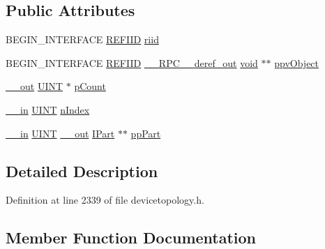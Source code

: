 \subsection*{Public Attributes}
\begin{DoxyCompactItemize}
\item 
B\+E\+G\+I\+N\+\_\+\+I\+N\+T\+E\+R\+F\+A\+CE \hyperlink{px__win__ds_8c_a80ec49c8ae61e234197d5071d2df497d}{R\+E\+F\+I\+ID} \hyperlink{struct_i_parts_list_vtbl_a64c041e5979c2a523f9fb3580a5993f9}{riid}
\item 
B\+E\+G\+I\+N\+\_\+\+I\+N\+T\+E\+R\+F\+A\+CE \hyperlink{px__win__ds_8c_a80ec49c8ae61e234197d5071d2df497d}{R\+E\+F\+I\+ID} \hyperlink{rpcsal_8h_a23bc188526f10656f9c79d950f6c3192}{\+\_\+\+\_\+\+R\+P\+C\+\_\+\+\_\+deref\+\_\+out} \hyperlink{sound_8c_ae35f5844602719cf66324f4de2a658b3}{void} $\ast$$\ast$ \hyperlink{struct_i_parts_list_vtbl_a9686d042884915b00bb6ce3bad267549}{ppv\+Object}
\item 
\hyperlink{sal_8h_abb4c3c1135aab6c47cff22e7c16efb74}{\+\_\+\+\_\+out} \hyperlink{mapinls_8h_a36cb3b01d81ffd844bbbfb54003e06ec}{U\+I\+NT} $\ast$ \hyperlink{struct_i_parts_list_vtbl_aa5fa48419eddb181e7b5a7c5127bfcf0}{p\+Count}
\item 
\hyperlink{sal_8h_a3f6b8655e1aa9dfc15a9029f0343009e}{\+\_\+\+\_\+in} \hyperlink{mapinls_8h_a36cb3b01d81ffd844bbbfb54003e06ec}{U\+I\+NT} \hyperlink{struct_i_parts_list_vtbl_abef078e3fb82b1be38e9620afee2532f}{n\+Index}
\item 
\hyperlink{sal_8h_a3f6b8655e1aa9dfc15a9029f0343009e}{\+\_\+\+\_\+in} \hyperlink{mapinls_8h_a36cb3b01d81ffd844bbbfb54003e06ec}{U\+I\+NT} \hyperlink{sal_8h_abb4c3c1135aab6c47cff22e7c16efb74}{\+\_\+\+\_\+out} \hyperlink{devicetopology_8h_adabb5bd8e19759521e1498eef1d0b56f}{I\+Part} $\ast$$\ast$ \hyperlink{struct_i_parts_list_vtbl_a9dd761b0866c5440cb8016ee8756a679}{pp\+Part}
\end{DoxyCompactItemize}


\subsection{Detailed Description}


Definition at line 2339 of file devicetopology.\+h.



\subsection{Member Function Documentation}
